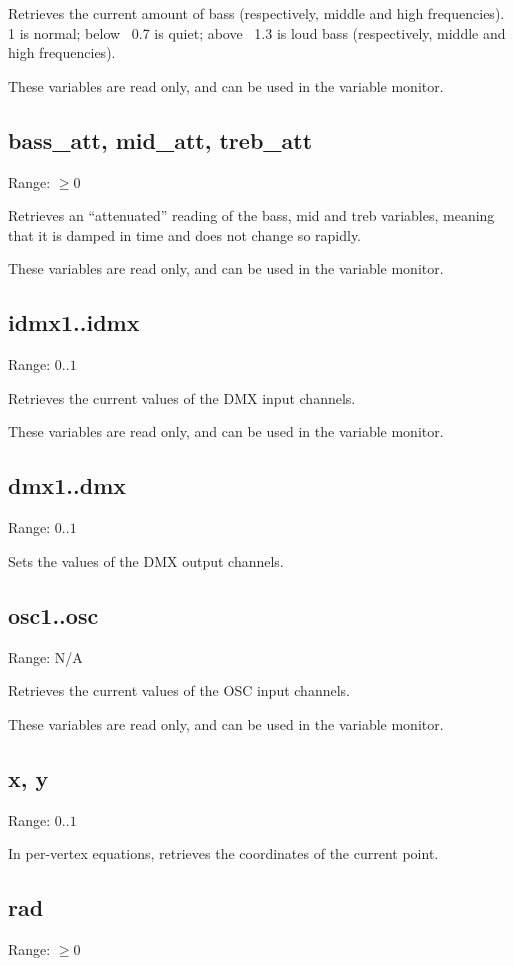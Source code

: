 \documentclass[11pt, a5paper, pagesize]{scrbook}
\begin{document}
Retrieves the current amount of bass (respectively, middle and high frequencies). 1 is normal; below ~0.7 is quiet; above ~1.3 is loud bass (respectively, middle and high frequencies).

These variables are read only, and can be used in the variable monitor.

\subsection{bass\_att, mid\_att, treb\_att}
Range: $\geq 0$

Retrieves an ``attenuated'' reading of the bass, mid and treb variables, meaning that it is damped in time and does not change so rapidly.

These variables are read only, and can be used in the variable monitor.

\subsection{idmx1..idmx\nidmx}
Range: $0..1$

Retrieves the current values of the DMX input channels.

These variables are read only, and can be used in the variable monitor.

\subsection{dmx1..dmx\ndmx}
Range: $0..1$

Sets the values of the DMX output channels.

\subsection{osc1..osc\nosc}
Range: N/A

Retrieves the current values of the OSC input channels.

These variables are read only, and can be used in the variable monitor.

\subsection{x, y}
Range: $0..1$

In per-vertex equations, retrieves the coordinates of the current point.

\subsection{rad}
Range: $\geq 0$
\end{document}
